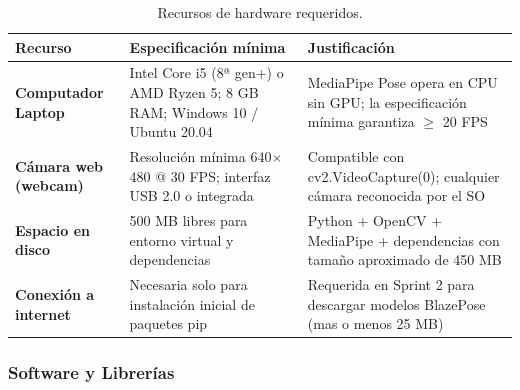 \begin{table}[H]
\centering
\label{tab:hardware}
\renewcommand{\arraystretch}{1.3}
\begin{tabularx}{\textwidth}{
    >{\bfseries}p{3cm}
    X
    X
}
\toprule
\textbf{Recurso} &
\textbf{Especificación mínima} &
\textbf{Justificación} \\
\midrule
Computador Laptop &
  Intel Core i5 (8ª gen+) o AMD Ryzen 5; 8 GB RAM;
  Windows 10 / Ubuntu 20.04 &
  MediaPipe Pose opera en CPU sin GPU; la especificación mínima garantiza
  $\geq$ 20 FPS \\
\midrule
Cámara web (webcam) &
  Resolución mínima 640$\times$480 @ 30 FPS; interfaz USB 2.0 o integrada &
  Compatible con cv2.VideoCapture(0); cualquier cámara reconocida
  por el SO \\
\midrule
Espacio en disco &
  500 MB libres para entorno virtual y dependencias &
  Python + OpenCV + MediaPipe + dependencias con tamaño aproximado de 450 MB \\
\midrule
Conexión a internet &
  Necesaria solo para instalación inicial de paquetes pip &
  Requerida en Sprint 2 para descargar modelos BlazePose (mas o menos 25 MB) \\
\bottomrule
\end{tabularx}
\caption{Recursos de hardware requeridos.}
\end{table}

\subsubsection*{Software y Librerías}


